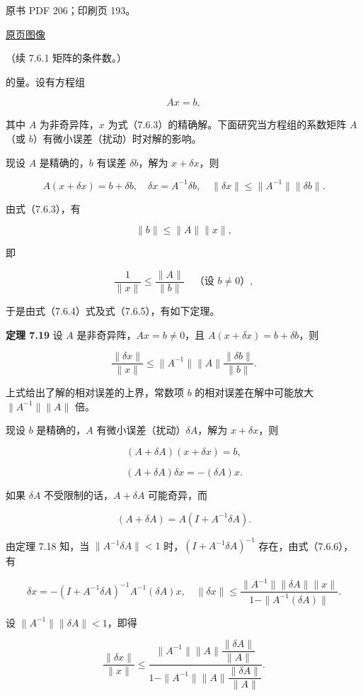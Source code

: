 \documentclass[
  10pt,
  fontset=fandol]{ctexart}
\begin{document}
\clearpage

原书 PDF 206；印刷页 193。

\href{../../../source-images/pdf-206.jpeg}{原页图像}

（续 7.6.1 矩阵的条件数。）

的量。设有方程组

\[
Ax=b,
\tag{7.6.3}
\]

其中 \(A\) 为非奇异阵，\(x\)
为式（7.6.3）的精确解。下面研究当方程组的系数矩阵 \(A\)（或
\(b\)）有微小误差（扰动）时对解的影响。

现设 \(A\) 是精确的，\(b\) 有误差 \(\delta b\)，解为 \(x+\delta x\)，则

\[
A(x+\delta x)=b+\delta b,\quad\delta x=A^{-1}\delta b,\quad\|\delta x\|\leqslant\|A^{-1}\|\|\delta b\|.
\tag{7.6.4}
\]

由式（7.6.3），有

\[
\|b\|\leqslant\|A\|\|x\|,
\]

即

\[
\frac1{\|x\|}\leqslant\frac{\|A\|}{\|b\|}\quad\text{（设 }b\neq0\text{）},
\tag{7.6.5}
\]

于是由式（7.6.4）式及式（7.6.5），有如下定理。

\textbf{定理 7.19} 设 \(A\) 是非奇异阵，\(Ax=b\neq0\)，且
\(A(x+\delta x)=b+\delta b\)，则

\[
\frac{\|\delta x\|}{\|x\|}\leqslant\|A^{-1}\|\|A\|\frac{\|\delta b\|}{\|b\|}.
\]

上式给出了解的相对误差的上界，常数项 \(b\) 的相对误差在解中可能放大
\(\|A^{-1}\|\|A\|\) 倍。

现设 \(b\) 是精确的，\(A\) 有微小误差（扰动）\(\delta A\)，解为
\(x+\delta x\)，则

\[
(A+\delta A)(x+\delta x)=b,
\]

\[
(A+\delta A)\delta x=-(\delta A)x.
\tag{7.6.6}
\]

如果 \(\delta A\) 不受限制的话，\(A+\delta A\) 可能奇异，而

\[
(A+\delta A)=A(I+A^{-1}\delta A).
\]

由定理 7.18 知，当 \(\|A^{-1}\delta A\|<1\)
时，\((I+A^{-1}\delta A)^{-1}\) 存在，由式（7.6.6），有

\[
\delta x=-(I+A^{-1}\delta A)^{-1}A^{-1}(\delta A)x,\quad
\|\delta x\|\leqslant\frac{\|A^{-1}\|\|\delta A\|\|x\|}{1-\|A^{-1}(\delta A)\|}.
\]

设 \(\|A^{-1}\|\|\delta A\|<1\)，即得

\[
\frac{\|\delta x\|}{\|x\|}
\leqslant
\frac{\|A^{-1}\|\|A\|\dfrac{\|\delta A\|}{\|A\|}}
{1-\|A^{-1}\|\|A\|\dfrac{\|\delta A\|}{\|A\|}}.
\tag{7.6.7}
\]
\end{document}
